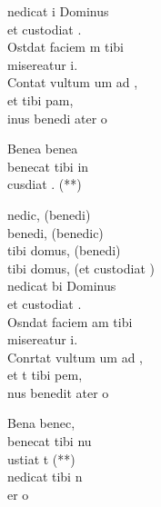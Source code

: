 \begin{cancion}[Benedicat][]%
	nedicat i Dominus \\
	et custodiat .\\
	Ostdat faciem m tibi\\
	 misereatur i.\\
	Contat vultum um ad ,\\
	et  tibi pam,\\
	inus benedi ater o \\
	\begin{chorus}%
	Benea     benea \\
	benecat tibi in\\
	 cusdiat . (**)\\
	\end{chorus}%
	nedic, (benedi)\\
	benedi, (benedic)\\
	tibi domus, (benedi)\\
	tibi domus, (et custodiat )\\
	nedicat bi Dominus\\
	et custodiat .\\
	Osndat faciem am tibi\\
	 misereatur i.\\
	Conrtat vultum um ad ,\\
	et t tibi pem,\\
	nus benedit ater o \\
	\begin{chorus}%
	Bena     benec,\\
	benecat tibi nu\\
	ustiat t (**)\\
	nedicat tibi n\\
	er o \\
	\end{chorus}%
\end{cancion}%
